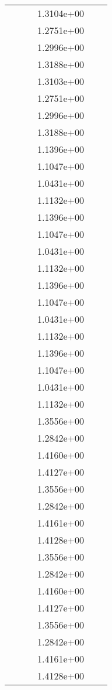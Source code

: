 \begin{xltabular}{\textwidth}{r|rS[table-format=1.3e+2]S[table-format=1.4e+2]S[table-format=1.4e+2]S[table-format=-1.5]}
&  &  & 1.3104e+00 & & \\
&  &  & 1.2751e+00 & & \\
&  &  & 1.2996e+00 & & \\
&  &  & 1.3188e+00 & & \\
&  &  & 1.3103e+00 & & \\
&  &  & 1.2751e+00 & & \\
&  &  & 1.2996e+00 & & \\
&  &  & 1.3188e+00 & & \\
&  &  & 1.1396e+00 & & \\
&  &  & 1.1047e+00 & & \\
&  &  & 1.0431e+00 & & \\
&  &  & 1.1132e+00 & & \\
&  &  & 1.1396e+00 & & \\
&  &  & 1.1047e+00 & & \\
&  &  & 1.0431e+00 & & \\
&  &  & 1.1132e+00 & & \\
&  &  & 1.1396e+00 & & \\
&  &  & 1.1047e+00 & & \\
&  &  & 1.0431e+00 & & \\
&  &  & 1.1132e+00 & & \\
&  &  & 1.1396e+00 & & \\
&  &  & 1.1047e+00 & & \\
&  &  & 1.0431e+00 & & \\
&  &  & 1.1132e+00 & & \\
&  &  & 1.3556e+00 & & \\
&  &  & 1.2842e+00 & & \\
&  &  & 1.4160e+00 & & \\
&  &  & 1.4127e+00 & & \\
&  &  & 1.3556e+00 & & \\
&  &  & 1.2842e+00 & & \\
&  &  & 1.4161e+00 & & \\
&  &  & 1.4128e+00 & & \\
&  &  & 1.3556e+00 & & \\
&  &  & 1.2842e+00 & & \\
&  &  & 1.4160e+00 & & \\
&  &  & 1.4127e+00 & & \\
&  &  & 1.3556e+00 & & \\
&  &  & 1.2842e+00 & & \\
&  &  & 1.4161e+00 & & \\
&  &  & 1.4128e+00 & & \\

\end{xltabular}
